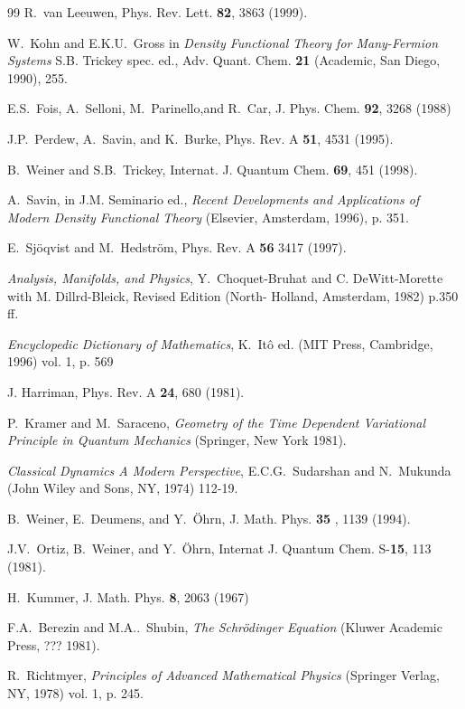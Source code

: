 \begin{thebibliography}{99}
 R.~van Leeuwen, Phys. Rev. Lett. {\bf 82}, 3863 (1999).

 W.~Kohn and E.K.U.~Gross in {\it Density Functional
Theory for Many-Fermion Systems} S.B. Trickey spec. ed., Adv. Quant. Chem. 
{\bf 21} (Academic, San Diego, 1990), 255.

 E.S.~Fois, A.~Selloni, M.~Parinello,and R.~Car, J. Phys.
Chem. {\bf 92}, 3268 (1988)

 J.P.~Perdew, A.~Savin, and K.~Burke, Phys. Rev. A {\bf %
51}, 4531 (1995).

 B.~Weiner and S.B.~Trickey, Internat. J. Quantum Chem. 
{\bf 69}, 451 (1998).

 A.~Savin, in J.M. Seminario ed., {\it Recent
Developments and Applications of Modern Density Functional Theory}
(Elsevier, Amsterdam, 1996), p. 351.

 E.~Sj\"oqvist and M.~Hedstr\"om, Phys. Rev. A {\bf 56}
3417 (1997).

 {\it Analysis, Manifolds, and Physics}, Y.~Choquet-Bruhat
and C. DeWitt-Morette with M. Dillrd-Bleick, Revised Edition (North-
Holland, Amsterdam, 1982) p.350 ff.

 {\it Encyclopedic Dictionary of Mathematics},
K.~It\^o ed. (MIT Press, Cambridge, 1996) vol. 1, p. 569

 J. Harriman, Phys. Rev. A {\bf 24}, 680 (1981).

 P.~Kramer and M.~Saraceno, {\it Geometry of the Time
Dependent Variational Principle in Quantum Mechanics} (Springer, New York
1981).

 {\it Classical Dynamics A Modern Perspective},
E.C.G.~Sudarshan and N.~Mukunda (John Wiley and Sons, NY, 1974) 112-19.

 B.~Weiner, E.~Deumens, and Y.~\"Ohrn, J. Math. Phys. {\bf 35}%
, 1139 (1994).

 J.V.~Ortiz, B.~Weiner, and Y.~\"Ohrn, Internat J. Quantum
Chem. S-{\bf 15}, 113 (1981).


 H.~Kummer, J. Math. Phys. {\bf 8}, 2063 (1967)

 F.A.~Berezin and M.A..~Shubin, {\it The
Schr\"odinger Equation} (Kluwer Academic Press, ??? 1981).

 R.~Richtmyer, {\it Principles of Advanced Mathematical
Physics} (Springer Verlag, NY, 1978) vol. 1, p. 245.
\end{thebibliography}


